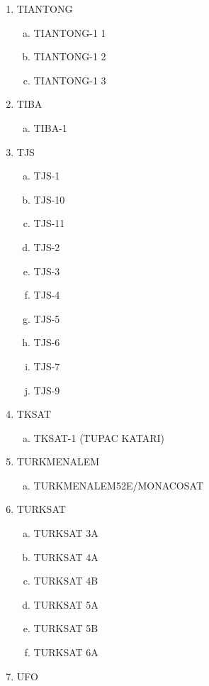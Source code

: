 \begin{multicols}{2}
\begin{enumerate}
\begin{enumerate}[a.]
    \item TIANLIAN 2-03
  \end{enumerate}
  \item TIANTONG
  \begin{enumerate}[a.]
    \item TIANTONG-1 1
    \item TIANTONG-1 2
    \item TIANTONG-1 3
  \end{enumerate}
  \item TIBA
  \begin{enumerate}[a.]
    \item TIBA-1
  \end{enumerate}
  \item TJS
  \begin{enumerate}[a.]
    \item TJS-1
    \item TJS-10
    \item TJS-11
    \item TJS-2
    \item TJS-3
    \item TJS-4
    \item TJS-5
    \item TJS-6
    \item TJS-7
    \item TJS-9
  \end{enumerate}
  \item TKSAT
  \begin{enumerate}[a.]
    \item TKSAT-1 (TUPAC KATARI)
  \end{enumerate}
  \item TURKMENALEM
  \begin{enumerate}[a.]
    \item TURKMENALEM52E/MONACOSAT
  \end{enumerate}
  \item TURKSAT
  \begin{enumerate}[a.]
    \item TURKSAT 3A
    \item TURKSAT 4A
    \item TURKSAT 4B
    \item TURKSAT 5A
    \item TURKSAT 5B
    \item TURKSAT 6A
  \end{enumerate}
  \item UFO
  \begin{enumerate}[a.]

\end{enumerate}
\end{enumerate}
\end{multicols}
